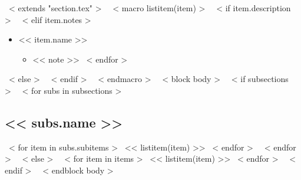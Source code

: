 ~< extends "section.tex" >~
~< macro listitem(item) >~
  ~< if item.description >~
  ~< elif item.notes >~
    \begin{itemize}
      \item{<< item.name >>}
      \begin{itemize}
      ~< for note in item.notes >~
        \item{<< note >>}
      ~< endfor >~
      \end{itemize}
    \end{itemize}
  ~< else >~
  ~< endif >~
~< endmacro >~
~< block body >~
  ~< if subsections >~
    ~< for subs in subsections >~
      \subsection{<< subs.name >>}
        ~< for item in subs.subitems >~
          << listitem(item) >>
        ~< endfor >~
    ~< endfor >~
  ~< else >~
    ~< for item in items >~
      << listitem(item) >>
    ~< endfor >~
  ~< endif >~
~< endblock body >~
